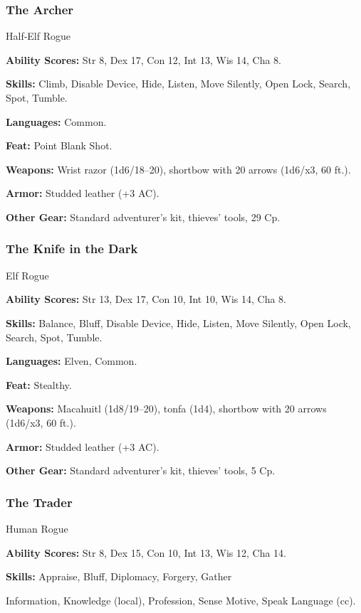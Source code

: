 \subsubsection{The Archer}

Half‐Elf Rogue

\textbf{Ability Scores:} Str 8, Dex 17, Con 12, Int 13, Wis 14, Cha 8.

\textbf{Skills:} Climb, Disable Device, Hide, Listen, Move Silently, Open Lock, Search, Spot, Tumble.

\textbf{Languages:} Common.

\textbf{Feat:} Point Blank Shot.

\textbf{Weapons:} Wrist razor (1d6/18–20), shortbow with 20 arrows (1d6/x3, 60 ft.).

\textbf{Armor:} Studded leather (+3 AC).

\textbf{Other Gear:} Standard adventurer’s kit, thieves’ tools, 29 Cp.

\subsubsection{The Knife in the Dark}

Elf Rogue

\textbf{Ability Scores:} Str 13, Dex 17, Con 10, Int 10, Wis 14, Cha 8.

\textbf{Skills:} Balance, Bluff, Disable Device, Hide, Listen, Move Silently, Open Lock, Search, Spot, Tumble.

\textbf{Languages:} Elven, Common.

\textbf{Feat:} Stealthy.

\textbf{Weapons:} Macahuitl (1d8/19–20), tonfa (1d4), shortbow with 20 arrows (1d6/x3, 60 ft.).

\textbf{Armor:} Studded leather (+3 AC).

\textbf{Other Gear:} Standard adventurer’s kit, thieves’ tools, 5 Cp.

\subsubsection{The Trader}

Human Rogue

\textbf{Ability Scores:} Str 8, Dex 15, Con 10, Int 13, Wis 12, Cha 14.

\textbf{Skills:} Appraise, Bluff, Diplomacy, Forgery, Gather

Information, Knowledge (local), Profession, Sense Motive, Speak Language (cc).

